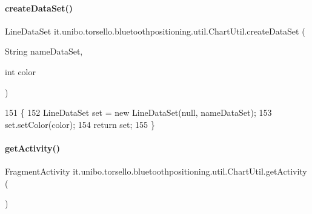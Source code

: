 \paragraph{\texorpdfstring{create\+Data\+Set()}{createDataSet()}\hspace{0.1cm}{\footnotesize\ttfamily [2/2]}}
{\footnotesize\ttfamily Line\+Data\+Set it.\+unibo.\+torsello.\+bluetoothpositioning.\+util.\+Chart\+Util.\+create\+Data\+Set (\begin{DoxyParamCaption}\item[{String}]{name\+Data\+Set,  }\item[{int}]{color }\end{DoxyParamCaption})\hspace{0.3cm}{\ttfamily [private]}}


\begin{DoxyCode}
151                                                                      \{
152         LineDataSet \textcolor{keyword}{set} = \textcolor{keyword}{new} LineDataSet(null, nameDataSet);
153         \textcolor{keyword}{set}.setColor(color);
154         \textcolor{keywordflow}{return} \textcolor{keyword}{set};
155     \}
\end{DoxyCode}
\hypertarget{classit_1_1unibo_1_1torsello_1_1bluetoothpositioning_1_1util_1_1ChartUtil_a59150a6d20b6d0ad2fcf8c1ba858d355_a59150a6d20b6d0ad2fcf8c1ba858d355}{}\label{classit_1_1unibo_1_1torsello_1_1bluetoothpositioning_1_1util_1_1ChartUtil_a59150a6d20b6d0ad2fcf8c1ba858d355_a59150a6d20b6d0ad2fcf8c1ba858d355} 
\paragraph{\texorpdfstring{get\+Activity()}{getActivity()}}
{\footnotesize\ttfamily Fragment\+Activity it.\+unibo.\+torsello.\+bluetoothpositioning.\+util.\+Chart\+Util.\+get\+Activity (\begin{DoxyParamCaption}{ }\end{DoxyParamCaption})}


